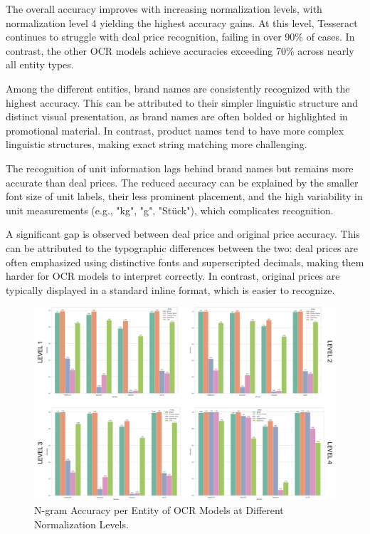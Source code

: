 \documentclass[11pt]{article}
\begin{document}
The overall accuracy improves with increasing normalization levels, with normalization level 4 yielding the highest accuracy gains. At this level, Tesseract continues to struggle with deal price recognition, failing in over 90\% of cases. In contrast, the other OCR models achieve accuracies exceeding 70\% across nearly all entity types.

Among the different entities, brand names are consistently recognized with the highest accuracy. This can be attributed to their simpler linguistic structure and distinct visual presentation, as brand names are often bolded or highlighted in promotional material. In contrast, product names tend to have more complex linguistic structures, making exact string matching more challenging.

The recognition of unit information lags behind brand names but remains more accurate than deal prices. The reduced accuracy can be explained by the smaller font size of unit labels, their less prominent placement, and the high variability in unit measurements (e.g., "kg", "g", "Stück"), which complicates recognition.

A significant gap is observed between deal price and original price accuracy. This can be attributed to the typographic differences between the two: deal prices are often emphasized using distinctive fonts and superscripted decimals, making them harder for OCR models to interpret correctly. In contrast, original prices are typically displayed in a standard inline format, which is easier to recognize.

\begin{figure}[h!]
    \centering
    \includegraphics[width=0.8\linewidth]{figures/eval_ocr_ngram_accuracies.png}
    \caption{N-gram Accuracy per Entity of OCR Models at Different Normalization Levels.}
    \label{fig:eval_ocr_ngram_accuracies}
\end{figure}
\end{document}
